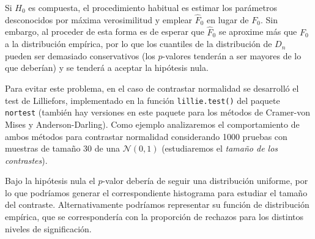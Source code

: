 \documentclass[
]{book}
\newenvironment{Shaded}{\begin{snugshade}}{\end{snugshade}}
\newcommand{\CommentTok}[1]{\textcolor[rgb]{0.56,0.35,0.01}{\textit{#1}}}
\newcommand{\ControlFlowTok}[1]{\textcolor[rgb]{0.13,0.29,0.53}{\textbf{#1}}}
\newcommand{\DecValTok}[1]{\textcolor[rgb]{0.00,0.00,0.81}{#1}}
\newcommand{\KeywordTok}[1]{\textcolor[rgb]{0.13,0.29,0.53}{\textbf{#1}}}
\newcommand{\NormalTok}[1]{#1}
\newcommand{\OperatorTok}[1]{\textcolor[rgb]{0.81,0.36,0.00}{\textbf{#1}}}
\newcommand{\StringTok}[1]{\textcolor[rgb]{0.31,0.60,0.02}{#1}}
\theoremstyle{definition}
\theoremstyle{definition}
\theoremstyle{definition}
\theoremstyle{remark}
\begin{document}
Si \(H_0\) es compuesta, el procedimiento habitual es estimar los parámetros desconocidos
por máxima verosimilitud y emplear \(\hat{F}_0\) en lugar de \(F_0\).
Sin embargo, al proceder de esta forma es de esperar que \(\hat{F}_0\) se aproxime más
que \(F_0\) a la distribución empírica, por lo que los cuantiles de la distribución de
\(D_n\) pueden ser demasiado conservativos (los \(p\)-valores tenderán a ser mayores de
lo que deberían) y se tenderá a aceptar la hipótesis nula.

Para evitar este problema, en el caso de contrastar normalidad se desarrolló el test
de Lilliefors, implementado en la función \texttt{lillie.test()} del paquete \texttt{nortest}
(también hay versiones en este paquete para los métodos de Cramer-von Mises y
Anderson-Darling). Como ejemplo analizaremos el comportamiento de ambos métodos
para contrastar normalidad considerando 1000 pruebas con muestras de tamaño 30 de
una \(\mathcal{N}(0,1)\) (estudiaremos el \emph{tamaño de los contrastes}).

\begin{Shaded}
\end{Shaded}

Bajo la hipótesis nula el \(p\)-valor debería de seguir una distribución uniforme,
por lo que podríamos generar el correspondiente histograma para estudiar el
tamaño del contraste. Alternativamente podríamos representar su función de
distribución empírica, que se correspondería con la proporción de rechazos
para los distintos niveles de significación.
\end{document}
